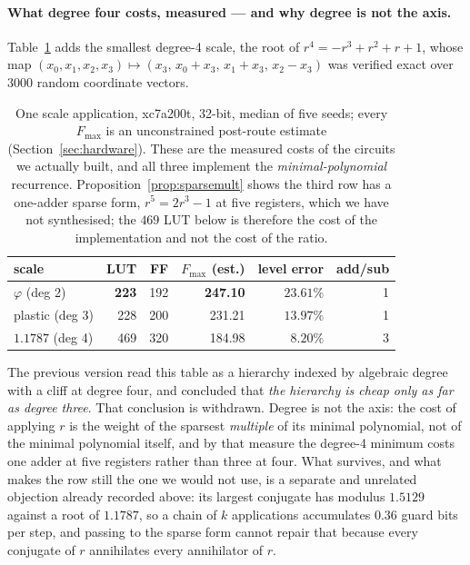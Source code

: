 \documentclass[11pt]{article}
\theoremstyle{definition}
\begin{document}
\paragraph{What degree four costs, measured --- and why degree is not the axis.}
Table~\ref{tab:deg4} adds the smallest degree-4 scale, the root of
$r^4=-r^3+r^2+r+1$, whose map $(x_0,x_1,x_2,x_3)\mapsto(x_3,\,x_0{+}x_3,\,
x_1{+}x_3,\,x_2{-}x_3)$ was verified exact over $3000$ random coordinate vectors.

\begin{table}[t]\centering
\caption{One scale application, xc7a200t, 32-bit, median of five seeds; every
$F_{\max}$ is an unconstrained post-route estimate (Section~\ref{sec:hardware}).
These are the measured costs of the circuits we actually built, and all three
implement the \emph{minimal-polynomial} recurrence.
Proposition~\ref{prop:sparsemult} shows the third row has a one-adder sparse form,
$r^{5}=2r^{3}-1$ at five registers, which we have not synthesised; the $469$ LUT
below is therefore the cost of the implementation and not the cost of the ratio.}
\label{tab:deg4}
\begin{tabular}{lrrrrr}
\toprule
scale & LUT & FF & $F_{\max}$ (est.) & level error & add/sub \\
\midrule
$\varphi$ (deg 2)      & \textbf{223} & 192 & \textbf{247.10} & $23.61\%$ & 1 \\
plastic (deg 3)        & 228 & 200 & 231.21 & $13.97\%$ & 1 \\
$1.1787$ (deg 4)       & 469 & 320 & 184.98 & $\mathbf{8.20\%}$ & 3 \\
\bottomrule
\end{tabular}
\end{table}

The previous version read this table as a hierarchy indexed by algebraic degree
with a cliff at degree four, and concluded that \emph{the hierarchy is cheap only
as far as degree three}. That conclusion is withdrawn. Degree is not the axis:
the cost of applying $r$ is the weight of the sparsest \emph{multiple} of its
minimal polynomial, not of the minimal polynomial itself, and by that measure the
degree-4 minimum costs one adder at five registers rather than three at four.
What survives, and what makes the row still the one we would not use, is a
separate and unrelated objection already recorded above: its largest conjugate has
modulus $1.5129$ against a root of $1.1787$, so a chain of $k$ applications
accumulates $0.36$ guard bits per step, and passing to the sparse form cannot
repair that because every conjugate of $r$ annihilates every annihilator of $r$.
\end{document}
